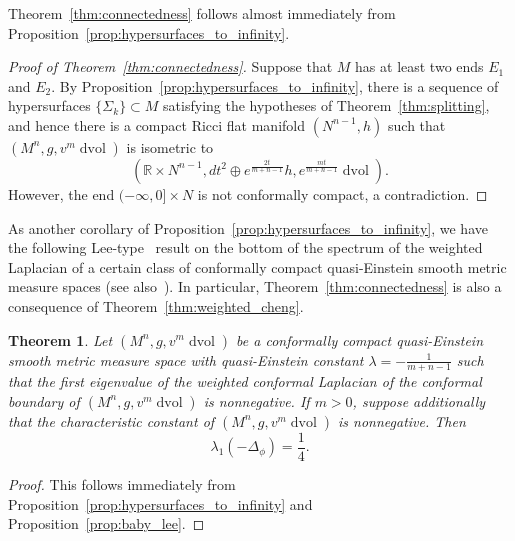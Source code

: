 \documentclass{amsart}
\newtheorem{thm}{Theorem}[section]
\theoremstyle{definition}
\theoremstyle{remark}
\numberwithin{equation}{section}
\begin{document}
Theorem~\ref{thm:connectedness} follows almost immediately from Proposition~\ref{prop:hypersurfaces_to_infinity}.

\begin{proof}[Proof of Theorem~\ref{thm:connectedness}]

Suppose that $M$ has at least two ends $E_1$ and $E_2$.  By Proposition~\ref{prop:hypersurfaces_to_infinity}, there is a sequence of hypersurfaces $\{\Sigma_k\}\subset M$ satisfying the hypotheses of Theorem~\ref{thm:splitting}, and hence there is a compact Ricci flat manifold $(N^{n-1},h)$ such that $(M^n,g,v^m\operatorname{dvol})$ is isometric to
\[ \left( {\mathbb{R}}\times N^{n-1}, dt^2\oplus e^{\frac{2t}{m+n-1}}h, e^{\frac{mt}{m+n-1}}\operatorname{dvol} \right) . \]
However, the end $(-\infty,0]\times N$ is not conformally compact, a contradiction.
\end{proof}

As another corollary of Proposition~\ref{prop:hypersurfaces_to_infinity}, we have the following Lee-type~\cite{Lee1995} result on the bottom of the spectrum of the weighted Laplacian of a certain class of conformally compact quasi-Einstein smooth metric measure spaces (see also~\cite{Wang2001a}).  In particular, Theorem~\ref{thm:connectedness} is also a consequence of Theorem~\ref{thm:weighted_cheng}.

\begin{thm}
\label{thm:ccqe_to_spectrum}
Let $(M^n,g,v^m\operatorname{dvol})$ be a conformally compact quasi-Einstein smooth metric measure space with quasi-Einstein constant $\lambda=-\frac{1}{m+n-1}$ such that the first eigenvalue of the weighted conformal Laplacian of the conformal boundary of $(M^n,g,v^m\operatorname{dvol})$ is nonnegative.  If $m>0$, suppose additionally that the characteristic constant of $(M^n,g,v^m\operatorname{dvol})$ is nonnegative.  Then
\[ \lambda_1(-\Delta_\phi) = \frac{1}{4} . \]
\end{thm}

\begin{proof}

This follows immediately from Proposition~\ref{prop:hypersurfaces_to_infinity} and Proposition~\ref{prop:baby_lee}.
\end{proof}



\end{document}
